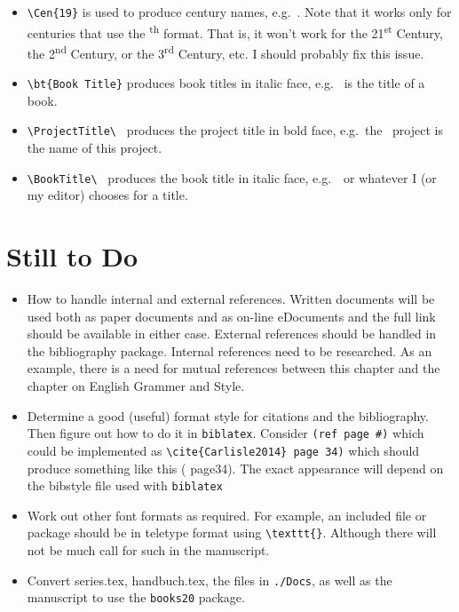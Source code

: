 \begin{itemize}

\item \verb|\Cen{19}| is used to produce century names,
  e.g.\ . Note that it works only for centuries that use the
  \textsuperscript{th} format.  That is, it won't work for the
  21\textsuperscript{st} Century, the 2\textsuperscript{nd} Century,
  or the 3\textsuperscript{rd} Century, etc. I should probably fix
  this issue.

\item \verb|\bt{Book Title}| produces book titles in italic face,
e.g.\  is the title of a book.

\item \verb|\ProjectTitle\ | produces the project title in bold face,
  e.g.\ the \ProjectTitle\ project is the name of this project.

\item \verb|\BookTitle\ | produces the book title in italic face,
  e.g.\ \BookTitle\ or whatever I (or my editor) chooses for a title.

\end{itemize}

\section{Still to Do}

\begin{itemize}

\item How to handle internal and external references.  Written
  documents will be used both as paper documents and as on-line
  eDocuments and the full link should be available in either
  case. External references should be handled in the bibliography
  package. Internal references need to be researched.  As an example,
  there is a need for mutual references between this chapter and the
  chapter on English Grammer and Style.

\item Determine a good (useful) format style for citations and the
  bibliography.  Then figure out how to do it in \texttt{biblatex}.
  Consider \texttt{(ref page \#)} which could be implemented as
  \verb|\cite{Carlisle2014} page 34)| which should produce something
  like this (\cite{Carlisle2014} page34). The exact appearance will
  depend on the bibstyle file used with \texttt{biblatex}

\item Work out other font formats as required. For example, an included
  file or package should be in teletype format using \verb|\texttt{}|.
  Although there will not be much call for such in the manuscript.

\item Convert series.tex, handbuch.tex, the files in \texttt{./Docs}, as
  well as the manuscript to use the \texttt{books20} package.

\end{itemize}

